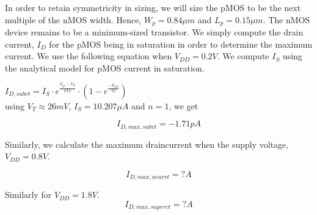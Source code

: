 \documentclass[12pt,a4paper]{article}
\begin{document}
\noindent In order to retain symmetricity in sizing, we will size the pMOS to be the next multiple of the nMOS width. Hence, $W_p = 0.84 \mu m$ and $L_p = 0.15 \mu m$. The nMOS device remains to be a minimum-sized transistor.
\newline\newline
\noindent We simply compute the drain current, $I_D$ for the pMOS being in saturation in order to determine the maximum current. We use the following equation when $V_{DD} = 0.2 V$. We compute $I_S$ using the analytical model for pMOS current in saturation.

\doublespacing
\begin{center}
    $I_{D,subvt} = I_S \cdot e^{\frac{V_{gs}-V_T}{nV_T}} \cdot (1-e^{\frac{-V_{DS}}{V_T}})$ \\
    using $V_T \approx 26 mV$, $I_S = 10.207 \mu A$ and $n=1$, we get
\end{center}
\singlespacing

\begin{equation}
    \label{eq:expt2-idmax-subvt}
    I_{D,max,subvt} = -1.71 pA
\end{equation}

\noindent Similarly, we calculate the maximum draincurrent when the supply voltage, $V_{DD} = 0.8 V$.

\begin{equation}
    \label{eq:expt2-idmax-nearvt}
    I_{D,max,nearvt} = ?A
\end{equation}

\noindent Similarly for $V_{DD} = 1.8 V$.
\begin{equation}
    \label{eq:expt2-idmax-supervt}
    I_{D,max,supervt} = ?A
\end{equation}
\end{document}
